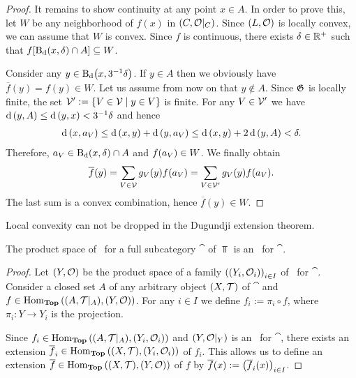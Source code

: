 \begin{proof}
	It remains to show continuity at any point $x \in A$. In order to prove this, let $W$ be any neighborhood of $f(x)$ in $\reltspace[C][O]$. Since $\tspace[L][O]$ is locally convex, we can assume \Wlog that $W$ is convex. Since $f$ is continuous, there exists $\delta \in \R^+$ such that $f\bbraces{\ball[x][\delta][\metric] \cap A} \subseteq W$.
	
	Consider any $y \in \ball[x][3^{-1}\delta][\metric]$. If $y \in A$ then we obviously have $\overline{f}(y) = f(y) \in W$. Let us assume from now on that $y \notin A$. Since $\partition[G]$ is locally finite, the set $\cover[V]^\prime := \Bbraces{V \in \cover[V] \mid y \in V}$ is finite. For any $V \in \cover[V]^\prime$ we have $\metric\pbraces{y, A} \leq \metric\pbraces{y, x} < 3^{-1}\delta$ and hence
	\begin{align*}
		\metric\pbraces{x, a_V} \leq \metric\pbraces{x, y} + \metric\pbraces{y, a_V} \leq \metric\pbraces{x, y} + 2 \metric\pbraces{y, A} < \delta.
	\end{align*}
	Therefore, $a_V \in \ball[x][\delta][\metric] \cap A$ and $f\pbraces{a_V} \in W$. We finally obtain
	\begin{align*}
		\overline{f}(y) = \sum_{V \in \cover[V]} g_V(y) f(a_V) = \sum_{V \in \cover[V]^\prime} g_V(y) f(a_V).
	\end{align*}
	The last sum is a convex combination, hence $\overline{f}(y) \in W$.
\end{proof}

\begin{remark}
	Local convexity can not be dropped in the Dugundji extension theorem.\cite[remark1.2.4]{IDT}
\end{remark}

\begin{proposition}
	The product space of \aexs\ for a full subcategory $\cat$ of $\Top$ is an \aex\ for $\cat$. 
\end{proposition}
\begin{proof}
	Let $\tspace[Y][O]$ be the product space of a family $\pbraces{\indtspace[Y][O]}_{i \in I}$ of \aexs\ for $\cat$. Consider a closed set $A$ of any arbitrary object $\tspace$ of $\cat$ and $f \in \Hom_\Top\pbraces{\reltspace, \tspace[Y][O]}$. For any $i \in I$ we define $f_i := \pi_i \circ f$, where $\pi_i: Y \to Y_i$ is the projection. 
	Since $f_i \in \Hom_\Top\pbraces{\reltspace, \indtspace[Y][O]}$ and $\reltspace[Y][O]$ is an \aex\ for $\cat$, there exists an extension $\overline{f}_i \in \Hom_\Top\pbraces{\tspace, \indtspace[Y][O]}$ of $f_i$. This allows us to define an extension $\overline{f} \in \Hom_\Top\pbraces{\tspace, \tspace[Y][O]}$ of $f$ by $\overline{f}(x) := \pbraces{\overline{f}_i(x)}_{i \in I}$. 
\end{proof}

